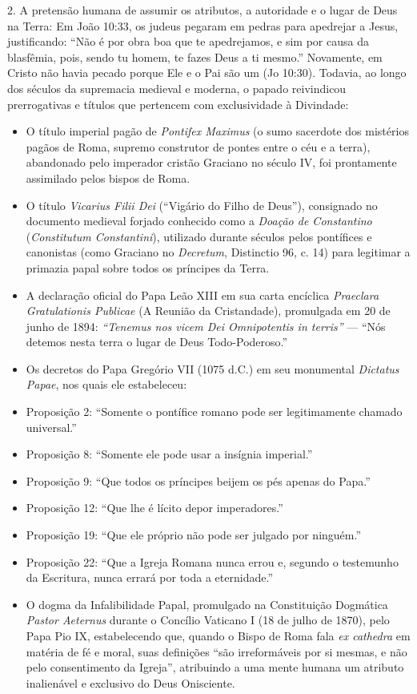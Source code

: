 \documentclass[11pt,a4paper,openany]{book}
\begin{document}
2. A pretensão humana de assumir os atributos, a autoridade e o lugar de Deus na Terra: Em João 10:33, os judeus pegaram em pedras para apedrejar a Jesus, justificando: ``Não é por obra boa que te apedrejamos, e sim por causa da blasfêmia, pois, sendo tu homem, te fazes Deus a ti mesmo.'' Novamente, em Cristo não havia pecado porque Ele e o Pai são um (Jo 10:30). Todavia, ao longo dos séculos da supremacia medieval e moderna, o papado reivindicou prerrogativas e títulos que pertencem com exclusividade à Divindade:
\begin{itemize}
  \item O título imperial pagão de \textit{Pontifex Maximus} (o sumo sacerdote dos mistérios pagãos de Roma, supremo construtor de pontes entre o céu e a terra), abandonado pelo imperador cristão Graciano no século IV, foi prontamente assimilado pelos bispos de Roma.
  \item O título \textit{Vicarius Filii Dei} (``Vigário do Filho de Deus''), consignado no documento medieval forjado conhecido como a \textit{Doação de Constantino} (\textit{Constitutum Constantini}), utilizado durante séculos pelos pontífices e canonistas (como Graciano no \textit{Decretum}, Distinctio 96, c. 14) para legitimar a primazia papal sobre todos os príncipes da Terra.
  \item A declaração oficial do Papa Leão XIII em sua carta encíclica \textit{Praeclara Gratulationis Publicae} (A Reunião da Cristandade), promulgada em 20 de junho de 1894: \textit{``Tenemus nos vicem Dei Omnipotentis in terris''} — ``Nós detemos nesta terra o lugar de Deus Todo-Poderoso.''
  \item Os decretos do Papa Gregório VII (1075 d.C.) em seu monumental \textit{Dictatus Papae}, nos quais ele estabeleceu:
  \item Proposição 2: ``Somente o pontífice romano pode ser legitimamente chamado universal.''
  \item Proposição 8: ``Somente ele pode usar a insígnia imperial.''
  \item Proposição 9: ``Que todos os príncipes beijem os pés apenas do Papa.''
  \item Proposição 12: ``Que lhe é lícito depor imperadores.''
  \item Proposição 19: ``Que ele próprio não pode ser julgado por ninguém.''
  \item Proposição 22: ``Que a Igreja Romana nunca errou e, segundo o testemunho da Escritura, nunca errará por toda a eternidade.''
  \item O dogma da Infalibilidade Papal, promulgado na Constituição Dogmática \textit{Pastor Aeternus} durante o Concílio Vaticano I (18 de julho de 1870), pelo Papa Pio IX, estabelecendo que, quando o Bispo de Roma fala \textit{ex cathedra} em matéria de fé e moral, suas definições ``são irreformáveis por si mesmas, e não pelo consentimento da Igreja'', atribuindo a uma mente humana um atributo inalienável e exclusivo do Deus Onisciente.
\end{itemize}
\end{document}
